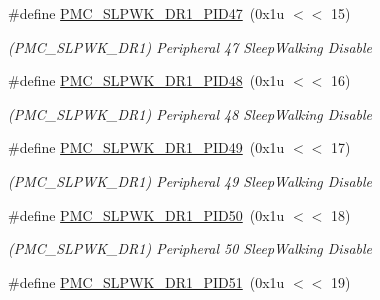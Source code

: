 \begin{DoxyCompactItemize}
\mbox{\label{group__SAME70__PMC_gae32fd6bbbae61bc66c0e49f82fb51440}} 
\#define \mbox{\hyperlink{group__SAME70__PMC_gae32fd6bbbae61bc66c0e49f82fb51440}{P\+M\+C\+\_\+\+S\+L\+P\+W\+K\+\_\+\+D\+R1\+\_\+\+P\+I\+D47}}~(0x1u $<$$<$ 15)
\begin{DoxyCompactList}\small\item\em (P\+M\+C\+\_\+\+S\+L\+P\+W\+K\+\_\+\+D\+R1) Peripheral 47 Sleep\+Walking Disable \end{DoxyCompactList}\item 
\mbox{\label{group__SAME70__PMC_ga71fcb7b9c9f1d45cbf20671232affec3}} 
\#define \mbox{\hyperlink{group__SAME70__PMC_ga71fcb7b9c9f1d45cbf20671232affec3}{P\+M\+C\+\_\+\+S\+L\+P\+W\+K\+\_\+\+D\+R1\+\_\+\+P\+I\+D48}}~(0x1u $<$$<$ 16)
\begin{DoxyCompactList}\small\item\em (P\+M\+C\+\_\+\+S\+L\+P\+W\+K\+\_\+\+D\+R1) Peripheral 48 Sleep\+Walking Disable \end{DoxyCompactList}\item 
\mbox{\label{group__SAME70__PMC_gaf486f7e217b7465f8dbdac9d83d50ffd}} 
\#define \mbox{\hyperlink{group__SAME70__PMC_gaf486f7e217b7465f8dbdac9d83d50ffd}{P\+M\+C\+\_\+\+S\+L\+P\+W\+K\+\_\+\+D\+R1\+\_\+\+P\+I\+D49}}~(0x1u $<$$<$ 17)
\begin{DoxyCompactList}\small\item\em (P\+M\+C\+\_\+\+S\+L\+P\+W\+K\+\_\+\+D\+R1) Peripheral 49 Sleep\+Walking Disable \end{DoxyCompactList}\item 
\mbox{\label{group__SAME70__PMC_ga9ac2b90f28a4c61bb37a6fa7dff3ac06}} 
\#define \mbox{\hyperlink{group__SAME70__PMC_ga9ac2b90f28a4c61bb37a6fa7dff3ac06}{P\+M\+C\+\_\+\+S\+L\+P\+W\+K\+\_\+\+D\+R1\+\_\+\+P\+I\+D50}}~(0x1u $<$$<$ 18)
\begin{DoxyCompactList}\small\item\em (P\+M\+C\+\_\+\+S\+L\+P\+W\+K\+\_\+\+D\+R1) Peripheral 50 Sleep\+Walking Disable \end{DoxyCompactList}\item 
\mbox{\label{group__SAME70__PMC_gaa0ca00032c84b2ac985009d303b9a492}} 
\#define \mbox{\hyperlink{group__SAME70__PMC_gaa0ca00032c84b2ac985009d303b9a492}{P\+M\+C\+\_\+\+S\+L\+P\+W\+K\+\_\+\+D\+R1\+\_\+\+P\+I\+D51}}~(0x1u $<$$<$ 19)
$$
\end{DoxyCompactItemize}
